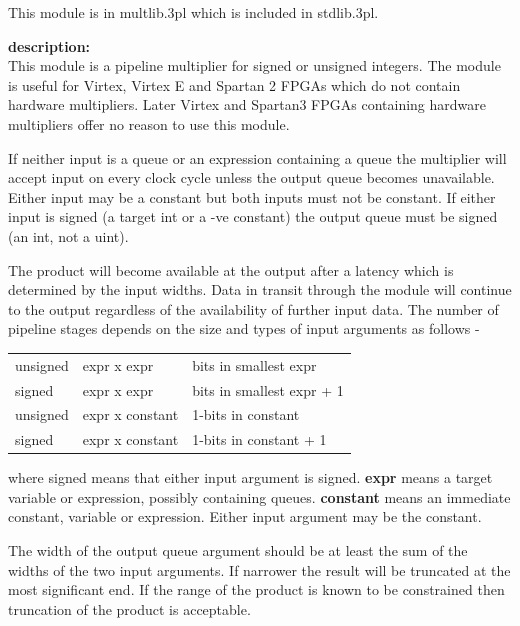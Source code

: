             This module is in multlib.3pl which is included in stdlib.3pl.

            {\bf description:} \\
            This module is a pipeline multiplier for signed or unsigned
            integers. The module is useful for Virtex, Virtex E and Spartan 2
            FPGAs which do not contain hardware multipliers. Later Virtex and
            Spartan3 FPGAs containing hardware multipliers offer no reason to
            use this module.
            
            If neither input is a queue or an expression containing a queue the
            multiplier will accept input on every clock cycle unless the output
            queue becomes unavailable. Either input may be a constant but both
            inputs must not be constant. If either input is signed (a target int
            or a -ve constant) the output queue must be signed (an int, not a
            uint).

            The product will become available at the output after a latency
            which is determined by the input widths. Data in transit through the
            module will continue to the output regardless of the availability of
            further input data. The number of pipeline stages depends on the
            size and types of input arguments as follows -

            \begin{tabular}{ l l l }
            unsigned  & expr x expr     & bits in smallest expr \\
            signed    & expr x expr     & bits in smallest expr + 1 \\
            unsigned  & expr x constant & 1-bits in constant \\
            signed    & expr x constant & 1-bits in constant + 1 \\
            \end{tabular}
            
            where signed means that either input argument is signed. {\bf
            expr} means a target variable or expression, possibly containing
            queues. {\bf constant} means an immediate constant, variable or
            expression. Either input argument may be the constant.
            
            The width of the output queue argument should be at least the sum
            of the widths of the two input arguments. If narrower the result
            will be truncated at the most significant end. If the range of
            the product is known to be constrained then truncation of the
            product is acceptable.
            
